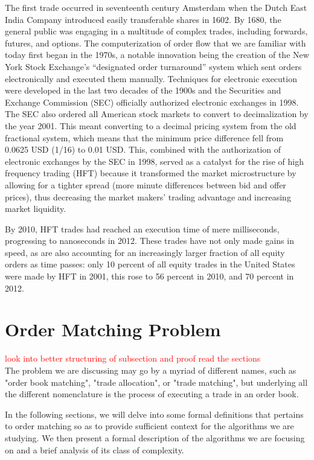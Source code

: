 \documentclass{article}
\newcommand{\todo}{\textcolor{red}}
\begin{document}
The first trade occurred in seventeenth century Amsterdam when the Dutch East India Company introduced easily transferable shares in 1602. By 1680, the general public was engaging in a multitude of complex trades, including forwards, futures, and options. The computerization of order flow that we are familiar with today first began in the 1970s, a notable innovation being the creation of the New York Stock Exchange’s “designated order turnaround”  system which sent orders electronically and executed them manually. Techniques for electronic execution were developed in the last two decades of the 1900s and the Securities and Exchange Commission (SEC) officially authorized electronic exchanges in 1998. The SEC also ordered all American stock markets to convert to decimalization by the year 2001. This meant converting to a decimal pricing system from the old fractional system, which means that the minimum price difference fell from 0.0625 USD (1/16) to 0.01 USD. This, combined with the authorization of electronic exchanges by the SEC in 1998, served as a catalyst for the rise of high frequency trading (HFT) because it transformed the market microstructure by allowing for a tighter spread (more minute differences between bid and offer prices), thus decreasing the market makers’ trading advantage and increasing market liquidity. 

By 2010, HFT trades had reached an execution time of mere milliseconds, progressing to nanoseconds in 2012. These trades have not only made gains in speed, as are also accounting for an increasingly larger fraction of all equity orders as time passes: only 10 percent of all equity trades in the United States were made by HFT in 2001, this rose to 56 percent in 2010, and 70 percent in 2012.


\section{Order Matching Problem}
\todo{look into better structuring of subsection and proof read the sections}\\
The problem we are discussing may go by a myriad of different names, such as "order book matching", "trade allocation", or "trade matching", but underlying all the different nomenclature is the process of executing a trade in an order book. 

In the following sections, we will delve into some formal definitions that pertains to order matching so as to provide sufficient context for the algorithms we are studying. We then present a formal description of the algorithms we are focusing on and a brief analysis of its class of complexity.  
\end{document}
